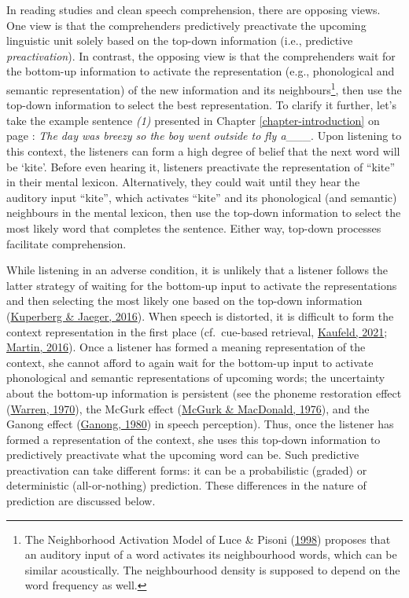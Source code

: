 \documentclass[a4paper, nobind]{templates/ociamthesis}
\begin{document}
In reading studies and clean speech comprehension, there are opposing views.
One view is that the comprehenders predictively preactivate the upcoming linguistic unit solely based on the top-down information (i.e., predictive \emph{preactivation}).
In contrast, the opposing view is that the comprehenders wait for the bottom-up information to activate the representation (e.g., phonological and semantic representation) of the new information and its neighbours\footnote{The Neighborhood Activation Model of Luce \& Pisoni (\protect\hyperlink{ref-Luce1998}{1998}) proposes that an auditory input of a word activates its neighbourhood words, which can be similar acoustically. The neighbourhood density is supposed to depend on the word frequency as well.},
then use the top-down information to select the best representation.
To clarify it further,
let's take the example sentence \emph{(1)} presented in Chapter \ref{chapter-introduction} on page \pageref{kite}:
\emph{The day was breezy so the boy went outside to fly a}\_\_\_.
Upon listening to this context, the listeners can form a high degree of belief that the next word will be `kite'.
Before even hearing it, listeners preactivate the representation of ``kite'' in their mental lexicon.
Alternatively, they could wait until they hear the auditory input ``kite'', which activates ``kite'' and its phonological (and semantic) neighbours in the mental lexicon,
then use the top-down information to select the most likely word that completes the sentence.
Either way, top-down processes facilitate comprehension.

While listening in an adverse condition, it is unlikely that a listener follows the latter strategy of waiting for the bottom-up input to activate the representations and then selecting the most likely one based on the top-down information (\protect\hyperlink{ref-Kuperberg2016}{Kuperberg \& Jaeger, 2016}).
When speech is distorted, it is difficult to form the context representation in the first place (cf.~cue-based retrieval, \protect\hyperlink{ref-Kaufeld2021}{Kaufeld, 2021}; \protect\hyperlink{ref-Martin2016}{Martin, 2016}).
Once a listener has formed a meaning representation of the context,
she cannot afford to again wait for the bottom-up input to activate phonological and semantic representations of upcoming words;
the uncertainty about the bottom-up information is persistent (see the phoneme restoration effect (\protect\hyperlink{ref-Warren1970}{Warren, 1970}), the McGurk effect (\protect\hyperlink{ref-McGurk1976}{McGurk \& MacDonald, 1976}), and the Ganong effect (\protect\hyperlink{ref-Ganong1980}{Ganong, 1980}) in speech perception).
Thus, once the listener has formed a representation of the context,
she uses this top-down information to predictively preactivate what the upcoming word can be.
Such predictive preactivation can take different forms:
it can be a probabilistic (graded) or deterministic (all-or-nothing) prediction.
These differences in the nature of prediction are discussed below.
\end{document}

